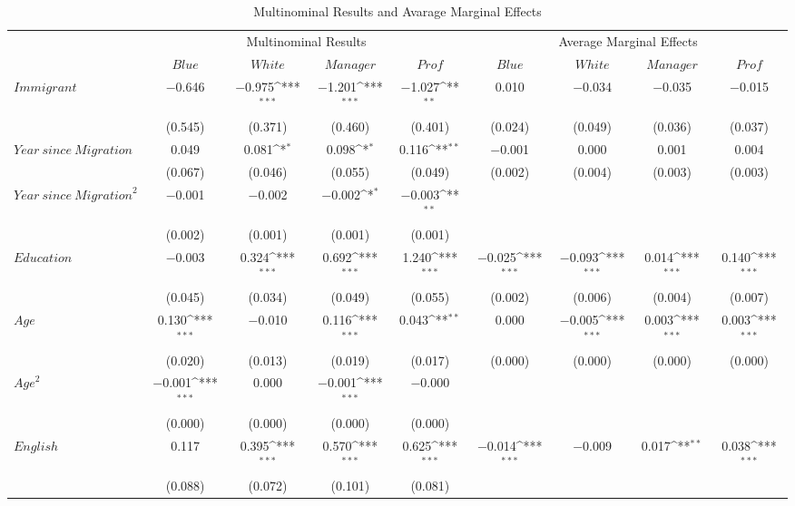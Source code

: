 {\scriptsize\centering
\def\sym#1{\ifmmode^{#1}\else\(^{#1}\)\fi}
\begin{longtable}{l*8c}
  \caption{Multinominal Results and Avarage Marginal Effects \label{lab:mlogit}} \\
  \toprule
  & \multicolumn{4}{c}{Multinominal Results}
  & \multicolumn{4}{c}{Average Marginal Effects} \\

  & $\mathit{Blue}$
  & $\mathit{White}$
  & $\mathit{Manager}$
  & $\mathit{Prof}$
  & $\mathit{Blue}$
  & $\mathit{White}$
  & $\mathit{Manager}$
  & $\mathit{Prof}$ \\\hline

  $\mathit{Immigrant}$
  & $-$0.646 & $-$0.975\sym{***} & $-$1.201\sym{***} & $-$1.027\sym{**}
  & 0.010 & $-$0.034 & $-$0.035 & $-$0.015 \\
  & (0.545) & (0.371) & (0.460) & (0.401)
  & (0.024) & (0.049) & (0.036) & (0.037) \\
  $\mathit{Year\ since\ Migration}$
  & 0.049 & 0.081\sym{*} &0.098\sym{*} & 0.116\sym{**}
  & $-$0.001 & 0.000 & 0.001 & 0.004 \\
  & (0.067) & (0.046) & (0.055) & (0.049)
  & (0.002) & (0.004) & (0.003) & (0.003) \\
  $\mathit{Year\ since\ Migration}^2$
  & $-$0.001 & $-$0.002 &$-$0.002\sym{*} & $-$0.003\sym{**}
  &&&& \\
  & (0.002) & (0.001) & (0.001) & (0.001)
  &&&& \\
  $\mathit{Education}$
  & $-$0.003 & 0.324\sym{***} & 0.692\sym{***}& 1.240\sym{***}
  & $-$0.025\sym{***}& $-$0.093\sym{***}& 0.014\sym{***}& 0.140\sym{***}\\
  & (0.045) & (0.034) & (0.049) & (0.055)
  & (0.002) & (0.006) & (0.004) & (0.007) \\
  $\mathit{Age}$
  & 0.130\sym{***}& $-$0.010 & 0.116\sym{***}&
  0.043\sym{**}
  & 0.000 & $-$0.005\sym{***}& 0.003\sym{***}& 0.003\sym{***}\\
  & (0.020) & (0.013) & (0.019) & (0.017)
  & (0.000) & (0.000) & (0.000) & (0.000) \\
  $\mathit{Age}^2$ & $-$0.001\sym{***}& 0.000 &
  $-$0.001\sym{***}& $-$0.000
  &&&& \\
  & (0.000) & (0.000) & (0.000) & (0.000)
  &&&& \\
  $\mathit{English}$ & 0.117 & 0.395\sym{***}&
  0.570\sym{***}& 0.625\sym{***}
  & $-$0.014\sym{***}& $-$0.009 & 0.017\sym{**} & 0.038\sym{***}\\
  & (0.088) & (0.072) & (0.101) & (0.081)

\end{longtable}}
